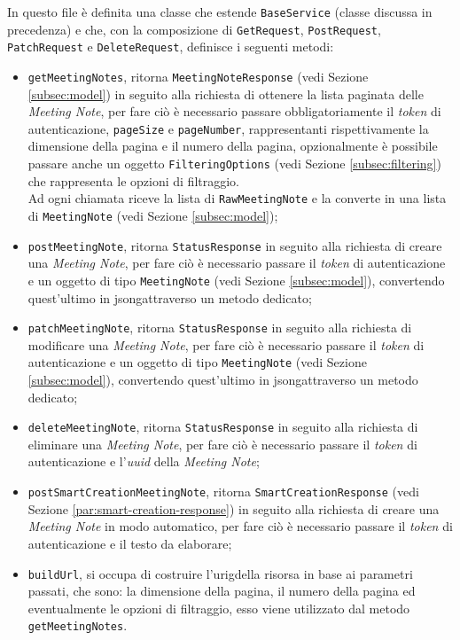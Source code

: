 In questo file è definita una classe che estende \lstinline{BaseService} (classe discussa in precedenza) e che, con la composizione di \lstinline{GetRequest}, \lstinline{PostRequest}, \lstinline{PatchRequest} e \lstinline{DeleteRequest}, definisce i seguenti metodi:
\begin{itemize}
    \item \lstinline{getMeetingNotes}, ritorna \lstinline{MeetingNoteResponse} (vedi Sezione \ref{subsec:model}) in seguito alla richiesta di ottenere la lista paginata delle \emph{Meeting Note}, per fare ciò è necessario passare obbligatoriamente il \emph{token} di autenticazione, \lstinline{pageSize} e \lstinline{pageNumber}, rappresentanti rispettivamente la dimensione della pagina e il numero della pagina, opzionalmente è possibile passare anche un oggetto \lstinline{FilteringOptions} (vedi Sezione \ref{subsec:filtering}) che rappresenta le opzioni di filtraggio. \\
    Ad ogni chiamata riceve la lista di \lstinline{RawMeetingNote} e la converte in una lista di \lstinline{MeetingNote} (vedi Sezione \ref{subsec:model});
    \item \lstinline{postMeetingNote}, ritorna \lstinline{StatusResponse} in seguito alla richiesta di creare una \emph{Meeting Note}, per fare ciò è necessario passare il \emph{token} di autenticazione e un oggetto di tipo \lstinline{MeetingNote} (vedi Sezione \ref{subsec:model}), convertendo quest'ultimo in \gls{jsong}\glsoccur attraverso un metodo dedicato;
    \item \lstinline{patchMeetingNote}, ritorna \lstinline{StatusResponse} in seguito alla richiesta di modificare una \emph{Meeting Note}, per fare ciò è necessario passare il \emph{token} di autenticazione e un oggetto di tipo \lstinline{MeetingNote} (vedi Sezione \ref{subsec:model}), convertendo quest'ultimo in \gls{jsong}\glsoccur attraverso un metodo dedicato;
    \item \lstinline{deleteMeetingNote}, ritorna \lstinline{StatusResponse} in seguito alla richiesta di eliminare una \emph{Meeting Note}, per fare ciò è necessario passare il \emph{token} di autenticazione e l'\emph{uuid} della \emph{Meeting Note};
    \item \lstinline{postSmartCreationMeetingNote}, ritorna \lstinline{SmartCreationResponse} (vedi Sezione \ref{par:smart-creation-response}) in seguito alla richiesta di creare una \emph{Meeting Note} in modo automatico, per fare ciò è necessario passare il \emph{token} di autenticazione e il testo da elaborare;
    \item \lstinline{buildUrl}, si occupa di costruire l'\gls{urig}\glsoccur della risorsa in base ai parametri passati, che sono: la dimensione della pagina, il numero della pagina ed eventualmente le opzioni di filtraggio, esso viene utilizzato dal metodo \lstinline{getMeetingNotes}.
\end{itemize}

